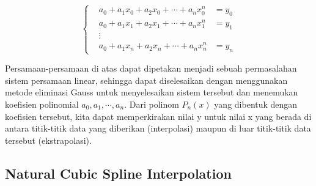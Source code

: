 \documentclass{article}
\begin{document}
\[
\left\{
\begin{aligned}
& a_0 + a_1x_0 + a_2x_0 + \cdots + a_nx_0^n &= y_0 \\
& a_0 + a_1x_1 + a_2x_1 + \cdots + a_nx_1^n &= y_1 \\
&\vdots \\
& a_0 + a_1x_n + a_2x_n + \cdots + a_nx_n^n &= y_n
\end{aligned}
\right.
\]

Persamaan-persamaan di atas dapat dipetakan menjadi sebuah permasalahan sistem persamaan linear, sehingga dapat diselesaikan dengan menggunakan metode eliminasi Gauss untuk menyelesaikan sistem tersebut dan menemukan koefisien polinomial $a_0, a_1,\cdots, a_n$. Dari polinom $P_{n}(x)$ yang dibentuk dengan koefisien tersebut, kita dapat memperkirakan nilai y untuk nilai x yang berada di antara
titik-titik data yang diberikan (interpolasi) maupun di luar titik-titik data tersebut (ekstrapolasi).

\subsection{Natural Cubic Spline Interpolation}
\end{document}
